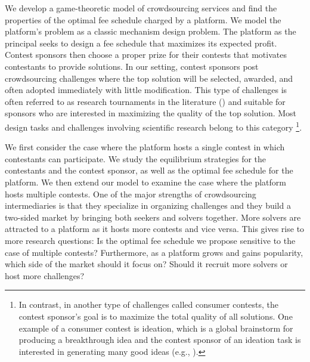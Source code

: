 \documentclass[12pt]{article}
\begin{document}
We develop a game-theoretic model of crowdsourcing services
and find the properties of the optimal fee schedule charged by a platform.
We model the platform's problem as a classic mechanism design
problem. The platform as the principal seeks to design a fee schedule
that maximizes its expected profit. Contest sponsors then choose a proper prize
for their contests that motivates contestants to provide solutions.
In our setting, contest sponsors post crowdsourcing challenges where
the top solution will be selected, awarded, and often adopted immediately
with little modification. This type of challenges is often referred
to as research tournaments in the literature (\citet{Moldovanu:2001}) and suitable for sponsors who are interested
in maximizing the quality of the top solution. Most design tasks and
challenges involving scientific research belong to this category%
\footnote{In contrast, in another type of challenges called consumer contests,
the contest sponsor's goal is to maximize the total quality of all
solutions. One example of a consumer contest is ideation, which is
a global brainstorm for producing a breakthrough idea and the contest
sponsor of an ideation task is interested in generating many good
ideas (e.g., \cite{Leim:2009}).%
}.

We first consider the case where the platform hosts a single contest in which contestants can participate. We study the equilibrium strategies for the contestants and the contest sponsor, as well as the optimal fee schedule for the platform. We then extend our model to examine the case where the platform hosts multiple contests. One of the major strengths of crowdsourcing intermediaries is that they specialize in organizing challenges and they build a two-sided market by bringing both seekers and solvers together. More solvers are attracted to a platform as it hosts more contests and vice versa. This gives rise to more research questions: Is the optimal fee schedule we propose sensitive to the case of multiple contests? Furthermore, as a platform grows and gains popularity, which side of the market should it focus on? Should it recruit more solvers or host more challenges?
\end{document}
